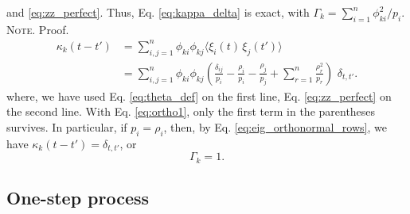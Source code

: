 \documentclass[reprint, superscriptaddress, floatfix]{revtex4-1}
\newcommand{\note}[1]{{\color{DarkGreen}\footnotesize \textsc{Note.} #1}}
\begin{document}
and
\eqref{eq:zz_perfect}.
%
Thus, Eq. \eqref{eq:kappa_delta} is exact,
with
$\Gamma_k = \sum_{ i = 1}^n \phi_{ki}^2 / p_i$.
\note{Proof.%
  $$
  \begin{aligned}
  \kappa_k(t - t')
  &=
  \sum_{i,j = 1}^n
  \phi_{ki}
  \phi_{kj}
  \langle \xi_i(t) \, \xi_j(t') \rangle
  \\
  &=
  \sum_{i,j = 1}^n
  \phi_{ki}
  \phi_{kj}
  \left(
    \frac{ \delta_{ij} } { p_i }
    -
    \frac{ \rho_i } { p_i }
    -
    \frac{ \rho_j } { p_j }
    +
    \sum_{r = 1}^n
    \frac{ \rho_r^2 } { p_r }
  \right) \,
  \, \delta_{t, t'}
  .
  \end{aligned}
  $$
  where,
  we have used
  Eq. \eqref{eq:theta_def}
  on the first line,
  Eq. \eqref{eq:zz_perfect}
  on the second line.
  With Eq. \eqref{eq:ortho1},
  only the first term in the parentheses survives.
}
In particular, if $p_i = \rho_i$, then, by
Eq. \eqref{eq:eig_orthonormal_rows}, we have
$\kappa_k(t - t') = \delta_{t, t'}$, or
\begin{equation}
  \Gamma_k = 1
  .
\label{eq:Gamma_perfect}
\end{equation}




\subsection{\label{sec:Gamma_onestep}
One-step process}
\end{document}
